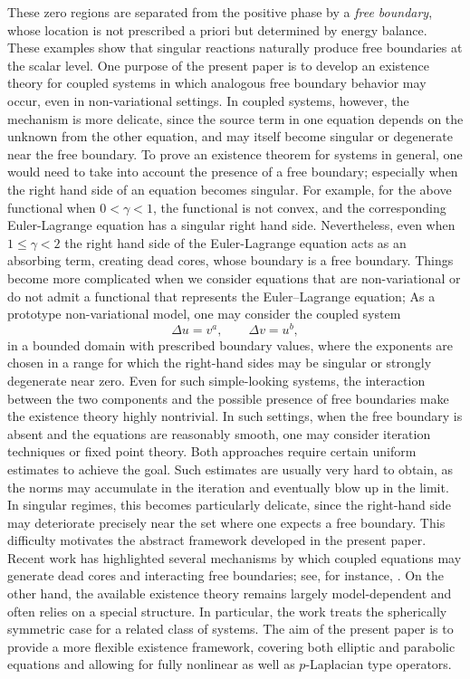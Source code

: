 \documentclass[11pt,oneside,english]{amsart}
\numberwithin{equation}{section}
\theoremstyle{plain}
\numberwithin{equation}{section}
\begin{document}
These zero regions are separated from the positive phase by a \emph{free boundary}, whose location is not prescribed a priori but determined by energy balance. These examples show that singular reactions naturally produce free boundaries at the scalar level. One purpose of the present paper is to develop an existence theory for coupled systems in which analogous free boundary behavior may occur, even in non-variational settings. In coupled systems, however, the mechanism is more delicate, since the source term in one equation depends on the unknown from the other equation, and may itself become singular or degenerate near the free boundary. To prove an existence theorem for systems in general, one would need to take into account the presence of a free boundary; especially when the right hand side of an equation becomes singular. For example, for the above functional when $0 < \gamma < 1$, the functional is not convex, and the corresponding Euler-Lagrange equation has a singular right hand side. Nevertheless, even when $1 \leq \gamma <2$ the right hand side of the Euler-Lagrange equation acts as an absorbing term, creating dead cores, whose boundary is a free boundary. 
Things become more complicated when we consider equations that are non-variational  or do not admit a functional that represents the Euler–Lagrange equation; As a prototype non-variational model, one may consider the coupled system
\begin{equation}\label{eq:system0}
    \Delta u = v^a, \qquad \Delta v= u^b,
\end{equation}
in a bounded domain with prescribed boundary values, where the exponents are chosen in a range for which the right-hand sides may be singular or strongly degenerate near zero.
Even for such simple-looking systems, the interaction between the two components and the possible presence of free boundaries make the existence theory highly nontrivial.
In such settings, when the free boundary is absent and the equations are reasonably smooth, one may consider iteration techniques or fixed point theory. Both approaches require certain uniform estimates to achieve the goal. Such estimates are usually very hard to obtain, as the norms may accumulate in the iteration and eventually blow up in the limit. In singular regimes, this becomes
particularly delicate, since the right-hand side may deteriorate precisely near the set where
one expects a free boundary. This difficulty motivates the abstract framework developed in the present paper.
Recent work has highlighted several mechanisms by which coupled equations may generate dead cores and interacting free boundaries; see, for instance, \cite{AraTey24, AraTey25}. On the other hand, the available existence theory remains largely model-dependent and often relies on a special structure. In particular, the work \cite{ELSH25} treats the spherically symmetric  case for a related class of systems. The aim of the present paper is to provide a more flexible existence framework, covering both elliptic and parabolic equations and allowing for fully nonlinear as well as $p$-Laplacian type operators.
\end{document}
